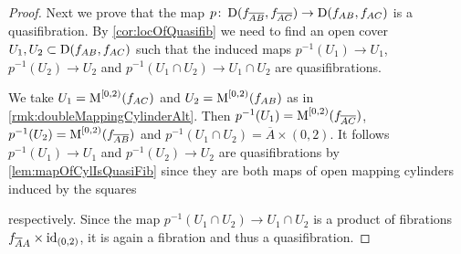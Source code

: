 \begin{prop}
\begin{proof}
        Next we prove that the map $p\colon\operatorname{D}(f_{\overline{A}\overline{B}},f_{\overline{A}\overline{C}})\to\operatorname{D}(f_{AB},f_{AC})$ is a quasifibration.
        By \cref{cor:locOfQuasifib} we need to find an open cover $U_1,U_2\subset\operatorname{D}(f_{AB},f_{AC})$ such that the induced maps $p^{-1}(U_1)\to U_1$, $p^{-1}(U_2)\to U_2$ and $p^{-1}(U_1\cap U_2)\to U_1\cap U_2$ are quasifibrations.

        We take $U_1=\operatorname{M}^{[0,2)}(f_{AC})$ and $U_2=\operatorname{M}^{[0,2)}(f_{AB})$ as in \cref{rmk:doubleMappingCylinderAlt}.
        Then $p^{-1}(U_1)=\operatorname{M}^{[0,2)}(f_{\overline{A}\overline{C}})$, $p^{-1}(U_2)=\operatorname{M}^{[0,2)}(f_{\overline{A}\overline{B}})$ and $p^{-1}(U_1\cap U_2)=\overline{A}\times (0,2)$.
        It follows $p^{-1}(U_1)\to U_1$ and $p^{-1}(U_2)\to U_2$ are quasifibrations by \cref{lem:mapOfCylIsQuasiFib} since they are both maps of open mapping cylinders induced by the squares 
        \begin{center}
        \end{center}
        respectively.
        Since the map $p^{-1}(U_1\cap U_2)\to U_1\cap U_2$ is a product of fibrations $f_{\overline{A}A}\times\text{id}_{(0,2)}$, it is again a fibration and thus a quasifibration.


\end{proof}
\end{prop}
